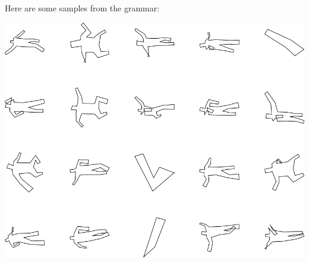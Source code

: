 Here are some samples from the grammar:

\includegraphics[width=6in]{output/3.learning/sdf_tuning/gram.4.d/samples.png}

